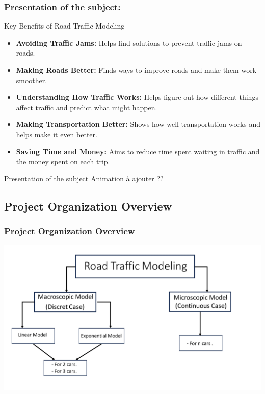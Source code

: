 \documentclass{beamer}
\begin{document}
\begin{frame}
        \frametitle{Presentation of the subject:}
	\begin{block}{Key Benefits of Road Traffic Modeling}
		\begin{itemize}
	\item \textbf{Avoiding Traffic Jams:} Helps find solutions to prevent traffic jams on roads.
	\item \textbf{Making Roads Better:} Finds ways to improve roads and make them work smoother.
	\item \textbf{Understanding How Traffic Works:} Helps figure out how different things affect traffic and predict what might happen.
	\item \textbf{Making Transportation Better:} Shows how well transportation works and helps make it even better.
	\item \textbf{Saving Time and Money:} Aims to reduce time spent waiting in traffic and the money spent on each trip.
\end{itemize}
	\end{block}
\end{frame}
\begin{frame}{Presentation of the subject}
    Animation à ajouter ??
\end{frame}
\begin{frame}
\subsection{Project Organization Overview}
\frametitle{Project Organization Overview}
\begin{center}
    \includegraphics[width=1\textwidth]{org1.png} 
    \end{center}
\end{frame}
\end{document}
